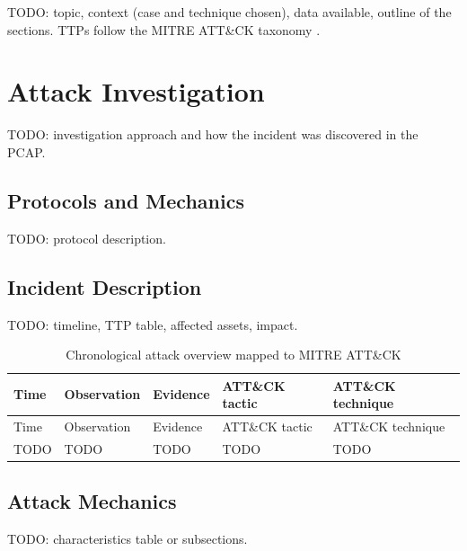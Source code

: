 \documentclass[
  a4paper,
  table]{article}
\begin{document}
TODO: topic, context (case and technique chosen), data available,
outline of the sections. TTPs follow the MITRE ATT\&CK taxonomy
\citep{attack}.

\section{Attack Investigation}\label{sec-attack-investigation}

TODO: investigation approach and how the incident was discovered in the
PCAP.

\subsection{Protocols and Mechanics}\label{sec-protocols}

TODO: protocol description.

\subsection{Incident Description}\label{sec-incident}

TODO: timeline, TTP table, affected assets, impact.

\begin{longtable}[]{@{}lllll@{}}
\caption{Chronological attack overview mapped to MITRE
ATT\&CK}\label{tbl-timeline}\tabularnewline
\toprule\noalign{}
Time & Observation & Evidence & ATT\&CK tactic & ATT\&CK technique \\
\midrule\noalign{}
\endfirsthead
\toprule\noalign{}
Time & Observation & Evidence & ATT\&CK tactic & ATT\&CK technique \\
\midrule\noalign{}
\endhead
\bottomrule\noalign{}
\endlastfoot
TODO & TODO & TODO & TODO & TODO \\
\end{longtable}

\subsection{Attack Mechanics}\label{sec-mechanics}

TODO: characteristics table or subsections.
\end{document}

